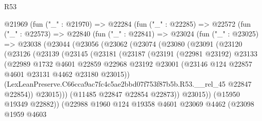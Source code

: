 \begin{lexlean}{R53}
\begin{coremodule}
        @21969
          (fun ("_" : @21970) =>
          @22284
            (fun ("_" : @22285) =>
            @22572
              (fun ("_" : @22573) =>
              @22840
                (fun ("_" : @22841) =>
                @23024
                  (fun ("_" : @23025) =>
                  @23038
                    (@23044
                      (@23056
                        (@23062
                          (@23074
                            (@23080
                              (@23091
                                (@23120
                                  (@23126
                                    (@23139
                                      (@23145
                                        (@23181
                                          (@23187
                                            (@23191
                                              (@22981 @23192)
                                              @23133
                                              (@22989
                                                @1732
                                                @4601
                                                @22859
                                                @22968
                                                @23192
                                                @23001
                                                (@23146
                                                  @124
                                                  @22857
                                                  @4601
                                                  @23131
                                                  @4462
                                                  @23180
                                                  @23015))
                                              (LexLeanPreserve.C66cca9ac7fc4c5ae2bbd07f753f87b5b.R53.__rel_45
                                                @22847
                                                @22854))
                                            @23015)))
                                      (@11485 @22847 @22854 @22873))
                                    @23015))
                                (@15950 @19349 @22882))
                              (@22988
                                @1960
                                @124
                                @19358
                                @4601
                                @23069
                                @4462
                                (@23098
                                  @1959
                                  @4603

\end{coremodule}
\end{lexlean}
